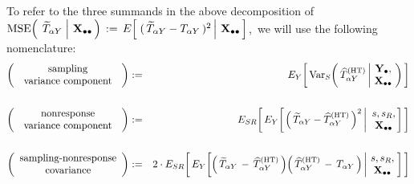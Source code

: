 \vskip 0.75cm
\noindent
To refer to the three summands in the above decomposition of
\,$
\textnormal{MSE}\!\left(\;
    \left.
    \widetilde{T}_{\alpha Y}
    \;\right\vert\,
    \mathbf{X}_{\bullet\bullet}
    \,\right)
\, := \,
    E\!\left[\,
        \left.
        (\,\widetilde{T}_{\alpha Y} - T_{\alpha Y}\,)^{2}
        \,\right\vert\,
        \mathbf{X}_{\bullet\bullet}
        \,\right]
$,\,
we will use the following nomenclature:
\vskip 0.01cm
\begin{eqnarray*}
\left(\begin{array}{c}
    \textnormal{sampling}
    \\
    \textnormal{\;\,variance component\;\,}
    \end{array}\right)
& := &
    E_{Y}\!\left[\,
    \Var_{S}\!\left(\,
        \widehat{T}^{\textnormal{(HT)}}_{\alpha Y}
        \left\vert\!
        \begin{array}{c} \Ydot, \\ \Xobs \end{array}
        \right.
        \!\!\right)
        \,\right]
\\ \\
\left(\begin{array}{c}
    \textnormal{nonresponse}
    \\
    \textnormal{\;\,variance component\;\,}
    \end{array}\right)
& := &
    E_{SR}\!\left[\,
    E_{Y}\!\left[
        \left.
        \left(\,\widetilde{T}_{\alpha Y} - \widehat{T}^{\textnormal{(HT)}}_{\alpha Y}\,\right)^{2}
        \,\right\vert\!
        \begin{array}{c} s,s_{R}, \\ \Xobs \end{array}
        \!\!\right]
        \,\right]
\\ \\
\left(\begin{array}{c}
    \textnormal{sampling-nonresponse}
    \\
    \textnormal{covariance}
    \end{array}\right)
& := &
    2\cdot
    E_{SR}\!\left[\,
    E_{Y}\!\left[
        \left(\,\widetilde{T}_{\alpha Y} \,-\, \widehat{T}^{\textnormal{(HT)}}_{\alpha Y}\,\right)
        \!
        \left(\,\widehat{T}^{\textnormal{(HT)}}_{\alpha Y} \,-\, T_{\alpha Y}\,\right)
        \left\vert\!
        \begin{array}{c} s,s_{R}, \\ \Xobs \end{array}
        \right.
        \!\!\right]
        \,\right]
\end{eqnarray*}

